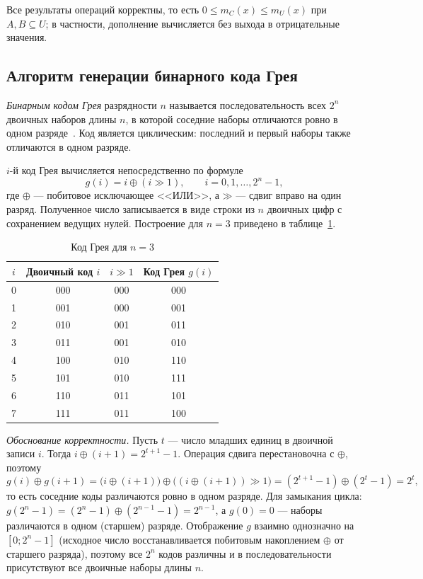 \documentclass[14pt,a4paper]{extarticle}
\newcommand{\mult}[2]{m_{#1}(#2)}
\newcommand{\xor}{\mathbin{\oplus}}
\newcommand{\shr}{\mathbin{\gg}}
\begin{document}
Все результаты операций корректны, то есть $0\le\mult{C}{x}\le\mult{U}{x}$ при $A,B\subseteq U$; в частности, дополнение вычисляется без выхода в отрицательные значения.

\subsection{Алгоритм генерации бинарного кода Грея}

\emph{Бинарным кодом Грея} разрядности $n$ называется последовательность всех $2^n$ двоичных наборов длины $n$, в которой соседние наборы отличаются ровно в одном разряде~\cite{knuth}. Код является циклическим: последний и первый наборы также отличаются в одном разряде.

$i$-й код Грея вычисляется непосредственно по формуле
\begin{equation}
g(i)=i\xor(i\shr 1),\qquad i=0,1,\ldots,2^n-1,
\end{equation}
где $\xor$ --- побитовое исключающее <<ИЛИ>>, а $\shr$ --- сдвиг вправо на один разряд. Полученное число записывается в виде строки из $n$ двоичных цифр с сохранением ведущих нулей. Построение для $n=3$ приведено в таблице~\ref{tab:gray}.

\begin{table}[H]
\caption{Код Грея для $n=3$}\label{tab:gray}
\centering\small\singlespacing
\begin{tabular}{cccc}
\toprule
$i$ & Двоичный код $i$ & $i\shr 1$ & Код Грея $g(i)$ \\
\midrule
0 & 000 & 000 & 000 \\
1 & 001 & 000 & 001 \\
2 & 010 & 001 & 011 \\
3 & 011 & 001 & 010 \\
4 & 100 & 010 & 110 \\
5 & 101 & 010 & 111 \\
6 & 110 & 011 & 101 \\
7 & 111 & 011 & 100 \\
\bottomrule
\end{tabular}
\end{table}

\textit{Обоснование корректности.} Пусть $t$ --- число младших единиц в двоичной записи $i$. Тогда $i\xor(i+1)=2^{t+1}-1$. Операция сдвига перестановочна с $\xor$, поэтому
\[
g(i)\xor g(i+1)=\bigl(i\xor(i+1)\bigr)\xor\bigl((i\xor(i+1))\shr 1\bigr)=(2^{t+1}-1)\xor(2^{t}-1)=2^{t},
\]
то есть соседние коды различаются ровно в одном разряде. Для замыкания цикла: $g(2^n-1)=(2^n-1)\xor(2^{n-1}-1)=2^{n-1}$, а $g(0)=0$ --- наборы различаются в одном (старшем) разряде. Отображение $g$ взаимно однозначно на $[0;2^n-1]$ (исходное число восстанавливается побитовым накоплением $\xor$ от старшего разряда), поэтому все $2^n$ кодов различны и в последовательности присутствуют все двоичные наборы длины $n$.
\end{document}
